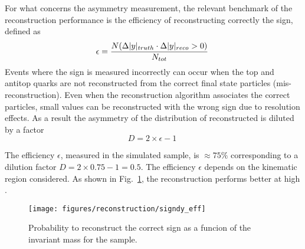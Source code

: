 For what concerns the asymmetry measurement, the relevant benchmark of
the reconstruction performance is the efficiency of reconstructing
correctly the \dy{} sign, defined as
\begin{equation}
  \label{eq:dysign}
  \epsilon = \frac{N(\Delta|y|{}_{truth}\cdot\Delta|y|{}_{reco}>0)}{N_{tot}}\phantom{.}
\end{equation}
Events where the \dy{} sign is measured incorrectly can occur when the top and
antitop quarks are not reconstructed from the correct final
state particles (mis-reconstruction). Even when the reconstruction
algorithm associates the correct particles, small \dy{} values can be
reconstructed with the wrong sign due to resolution effects.
As a result the asymmetry of the distribution of reconstructed \dy{}
is diluted by a factor 
\begin{equation}
  \label{eq:dilution}
D = 2\times{}\epsilon - 1\phantom{.}
\end{equation}  

The efficiency $\epsilon$, measured in the \ttbar{} simulated sample,
is $\approx75\%$ corresponding to a dilution factor
$D=2\times0.75-1=0.5$.
The efficiency $\epsilon$ depends on the kinematic region
considered. As shown in Fig.~\ref{fig:dysign}, the \dy{} reconstruction performs
better at high \mtt{}. 

\begin{figure}[!htb]\centering
  \texttt{[image: figures/reconstruction/signdy\_eff]}
  \caption{
    \label{fig:dysign}
    Probability to reconstruct the correct \dy{} sign as a funcion of
    the \ttbar{} invariant mass \mtt{} for the \mujets{} sample.
  }
\end{figure}

%

